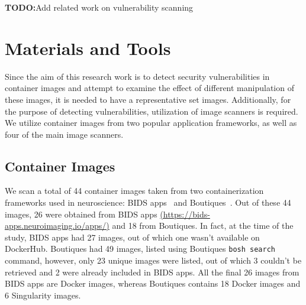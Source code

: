 \documentclass[a4paper,num-refs]{oup-contemporary}
\newcommand{\todo}[1]{\color{red}\textbf{TODO:}#1\color{black}}
\begin{document}

\todo{Add related work on vulnerability scanning}

\section{Materials and Tools}

Since the aim of this research work is to detect security vulnerabilities
in container images and attempt to examine the effect of different
manipulation of these images, it is needed to have a representative set
images. Additionally, for the purpose of detecting vulnerabilities,
utilization of image scanners is required. We utilize container
images from two popular application frameworks, as well as
four of the main image scanners.

\subsection{Container Images}

We scan a total of 44 container images taken from two containerization frameworks
used in neuroscience: BIDS
apps~\cite{gorgolewski2017bids} and Boutiques~\cite{glatard2018boutiques}.
Out of these 44 images, 26 were obtained from BIDS apps
\href{https://bids-apps.neuroimaging.io/apps/}{(https://bids-apps.neuroimaging.io/apps/)} 
and 18 from Boutiques. In fact, at the time of the study, BIDS apps had 27 images,
out of which one wasn't available on DockerHub. Boutiques had 49 images, listed using
Boutiques \texttt{bosh search} command,
however, only 23 unique images were listed, out of which 3 couldn't be retrieved and 2
 were already included in BIDS apps. All the final 26 images
from BIDS apps are Docker images, whereas Boutiques contains 18 Docker images
and 6 Singularity images.
\end{document}

